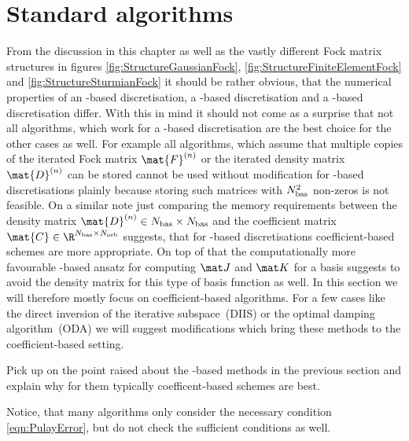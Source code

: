 \section{Standard \SCF algorithms}
\label{sec:SCFAlgorithms}

From the discussion in this chapter
as well as the vastly different Fock matrix structures
in figures \vref{fig:StructureGaussianFock},
\vref{fig:StructureFiniteElementFock}
and \vref{fig:StructureSturmianFock}
it should be rather obvious,
that the numerical properties of an \FE-based
discretisation, a \cGTO-based discretisation
and a \CS-based discretisation differ.
With this in mind it should not come as a surprise
that not all \SCF algorithms,
which work for a \cGTO-based discretisation
are the best choice for the other cases as well.
For example all \SCF algorithms,
which assume that multiple copies of the iterated Fock matrix $\mat{F}^{(n)}$
or the iterated density matrix $\mat{D}^{(n)}$
can be stored cannot be used without modification
for \FE-based discretisations
plainly because storing such matrices with $N_\text{bas}^2$ non-zeros is not feasible.
On a similar note just comparing the memory requirements
between the density matrix $\mat{D}^{(n)} \in \Nbas\times\Nbas$
and the coefficient matrix
$\mat{C} \in \R^{\Nbas\times\Norb}$
suggests, that for \FE-based discretisations
coefficient-based \SCF schemes are more appropriate.
On top of that the computationally
more favourable
\contract-based ansatz for computing
$\matJ$ and $\matK$ for a \CS basis
suggests to avoid the density matrix for this type of basis function as well.
In this section we will therefore
mostly focus on coefficient-based \SCF algorithms.
For a few cases like the direct inversion of the iterative subspace~(DIIS)
or the optimal damping algorithm~(ODA)
we will suggest modifications
which bring these methods to the coefficient-based setting.



Pick up on the point raised about the \contraction-based
methods in the previous section
and explain why for them typically
coefficent-based \SCF schemes are best.





Notice, that many \SCF algorithms only consider the necessary condition \eqref{eqn:PulayError},
but do not check the sufficient conditions as well.

